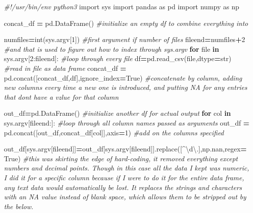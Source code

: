 \documentclass[
]{article}
\newenvironment{Shaded}{\begin{snugshade}}{\end{snugshade}}
\newcommand{\BuiltInTok}[1]{#1}
\newcommand{\CommentTok}[1]{\textcolor[rgb]{0.56,0.35,0.01}{\textit{#1}}}
\newcommand{\ControlFlowTok}[1]{\textcolor[rgb]{0.13,0.29,0.53}{\textbf{#1}}}
\newcommand{\DecValTok}[1]{\textcolor[rgb]{0.00,0.00,0.81}{#1}}
\newcommand{\ImportTok}[1]{#1}
\newcommand{\KeywordTok}[1]{\textcolor[rgb]{0.13,0.29,0.53}{\textbf{#1}}}
\newcommand{\NormalTok}[1]{#1}
\newcommand{\OperatorTok}[1]{\textcolor[rgb]{0.81,0.36,0.00}{\textbf{#1}}}
\newcommand{\StringTok}[1]{\textcolor[rgb]{0.31,0.60,0.02}{#1}}
\newcommand{\VariableTok}[1]{\textcolor[rgb]{0.00,0.00,0.00}{#1}}
\begin{document}
\begin{Shaded}
\begin{Highlighting}[]
\CommentTok{\#!/usr/bin/env python3}
\ImportTok{import}\NormalTok{ sys}
\ImportTok{import}\NormalTok{ pandas }\ImportTok{as}\NormalTok{ pd}
\ImportTok{import}\NormalTok{ numpy }\ImportTok{as}\NormalTok{ np}

\NormalTok{concat\_df }\OperatorTok{=}\NormalTok{ pd.DataFrame() }\CommentTok{\#initialize an empty df to combine everything into}

\NormalTok{numfiles}\OperatorTok{=}\BuiltInTok{int}\NormalTok{(sys.argv[}\DecValTok{1}\NormalTok{]) }\CommentTok{\#first argument if number of files}
\NormalTok{fileend}\OperatorTok{=}\NormalTok{numfiles}\OperatorTok{+}\DecValTok{2} \CommentTok{\#and that is used to figure out how to index through sys.argv}
\ControlFlowTok{for} \BuiltInTok{file} \KeywordTok{in}\NormalTok{ sys.argv[}\DecValTok{2}\NormalTok{:fileend]: }\CommentTok{\#loop through every file}
\NormalTok{    df}\OperatorTok{=}\NormalTok{pd.read\_csv(}\BuiltInTok{file}\NormalTok{,dtype}\OperatorTok{=}\BuiltInTok{str}\NormalTok{) }\CommentTok{\#read in file as data frame}
\NormalTok{    concat\_df }\OperatorTok{=}\NormalTok{ pd.concat([concat\_df,df],ignore\_index}\OperatorTok{=}\VariableTok{True}\NormalTok{) }\CommentTok{\#concatenate by column, adding new columns every time a new one is introduced, and putting NA for any entries that don\textquotesingle{}t have a vzlue for that column}

\NormalTok{out\_df}\OperatorTok{=}\NormalTok{pd.DataFrame() }\CommentTok{\#initialize another df for actual output}
\ControlFlowTok{for}\NormalTok{ col }\KeywordTok{in}\NormalTok{ sys.argv[fileend:]: }\CommentTok{\#loop through all column names passed as arguments}
\NormalTok{    out\_df }\OperatorTok{=}\NormalTok{ pd.concat([out\_df,concat\_df[col]],axis}\OperatorTok{=}\DecValTok{1}\NormalTok{) }\CommentTok{\#add on the columns specified}
    
\NormalTok{out\_df[sys.argv[fileend]]}\OperatorTok{=}\NormalTok{out\_df[sys.argv[fileend]].replace(}\StringTok{\textquotesingle{}[\^{}\textbackslash{}d\textbackslash{}.]\textquotesingle{}}\NormalTok{,np.nan,regex}\OperatorTok{=}\VariableTok{True}\NormalTok{) }\CommentTok{\#this was skirting the edge of hard{-}coding, it removed everything except numbers and decimal points. Though in this case all the data I kept was numeric, I did it for a specific column because if I were to do it for the entire data frame, any text data would automatically be lost. It replaces the strings and characters with an NA value instead of blank space, which allows them to be stripped out by the below.}


\end{Highlighting}
\end{Shaded}
\end{document}
